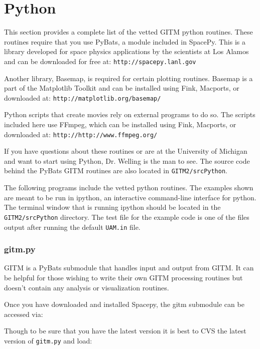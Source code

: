 \section{Python}
\label{python.sec}

This section provides a complete list of the vetted GITM python routines.  These routines require that you use PyBats, a module included in SpacePy.  This is a library developed for space physics applications by the scientists at Los Alamos and can be downloaded for free at: 
{\tt http://spacepy.lanl.gov}

Another library, Basemap, is required for certain plotting routines.  Basemap is a part of the Matplotlib Toolkit and can be installed using Fink, Macports, or downloaded at:
{\tt http://matplotlib.org/basemap/}

Python scripts that create movies rely on external programs to do so.  The scripts included here use FFmpeg, which can be installed using Fink, Macports, or downloaded at: {\tt http://http://www.ffmpeg.org/}

If you have questions about these routines or are at the University of Michigan and want to start using Python, Dr. Welling is the man to see.  The source code behind the PyBats GITM routines are also located in {\tt GITM2/srcPython}.

The following programs include the vetted python routines.  The examples shown are meant to be run in ipython, an interactive command-line interface for python.  The terminal window that is running ipython should be located in the {\tt GITM2/srcPython} directory.  The test file for the example code is one of the files output after running the default {\tt UAM.in} file.

\subsubsection{gitm.py}

GITM is a PyBats submodule that handles input and output from GITM.  It can be helpful for those wishing to write their own GITM processing routines but doesn't contain any analysis or visualization routines. 

Once you have downloaded and installed Spacepy, the gitm submodule can be accessed via:

 
 \noindent Though to be sure that you have the latest version it is best to CVS the latest version of {\tt gitm.py} and load:
 
